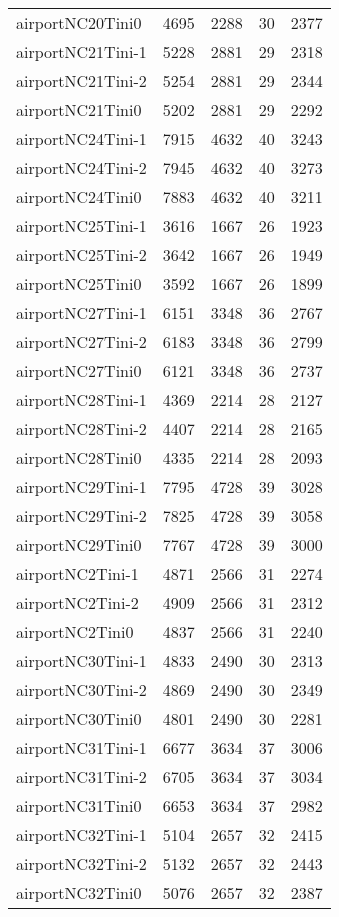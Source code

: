 \documentclass[../../../thesis.tex]{subfiles}
\begin{document}
\begin{longtable}{lrrrr}
airportNC20Tini0 & 4695 & 2288 & 30 & 2377 \\
airportNC21Tini-1 & 5228 & 2881 & 29 & 2318 \\
airportNC21Tini-2 & 5254 & 2881 & 29 & 2344 \\
airportNC21Tini0 & 5202 & 2881 & 29 & 2292 \\
airportNC24Tini-1 & 7915 & 4632 & 40 & 3243 \\
airportNC24Tini-2 & 7945 & 4632 & 40 & 3273 \\
airportNC24Tini0 & 7883 & 4632 & 40 & 3211 \\
airportNC25Tini-1 & 3616 & 1667 & 26 & 1923 \\
airportNC25Tini-2 & 3642 & 1667 & 26 & 1949 \\
airportNC25Tini0 & 3592 & 1667 & 26 & 1899 \\
airportNC27Tini-1 & 6151 & 3348 & 36 & 2767 \\
airportNC27Tini-2 & 6183 & 3348 & 36 & 2799 \\
airportNC27Tini0 & 6121 & 3348 & 36 & 2737 \\
airportNC28Tini-1 & 4369 & 2214 & 28 & 2127 \\
airportNC28Tini-2 & 4407 & 2214 & 28 & 2165 \\
airportNC28Tini0 & 4335 & 2214 & 28 & 2093 \\
airportNC29Tini-1 & 7795 & 4728 & 39 & 3028 \\
airportNC29Tini-2 & 7825 & 4728 & 39 & 3058 \\
airportNC29Tini0 & 7767 & 4728 & 39 & 3000 \\
airportNC2Tini-1 & 4871 & 2566 & 31 & 2274 \\
airportNC2Tini-2 & 4909 & 2566 & 31 & 2312 \\
airportNC2Tini0 & 4837 & 2566 & 31 & 2240 \\
airportNC30Tini-1 & 4833 & 2490 & 30 & 2313 \\
airportNC30Tini-2 & 4869 & 2490 & 30 & 2349 \\
airportNC30Tini0 & 4801 & 2490 & 30 & 2281 \\
airportNC31Tini-1 & 6677 & 3634 & 37 & 3006 \\
airportNC31Tini-2 & 6705 & 3634 & 37 & 3034 \\
airportNC31Tini0 & 6653 & 3634 & 37 & 2982 \\
airportNC32Tini-1 & 5104 & 2657 & 32 & 2415 \\
airportNC32Tini-2 & 5132 & 2657 & 32 & 2443 \\
airportNC32Tini0 & 5076 & 2657 & 32 & 2387 \\

\end{longtable}
\end{document}
